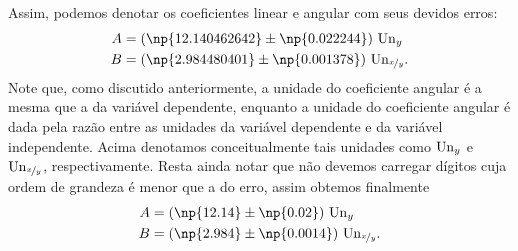 Assim, podemos denotar os coeficientes linear e angular com seus devidos erros:
\begin{align}
	A &= (\np{12.140462642} \pm \np{0.022244})~{\rm{Un}}_y\\
	B &= (\np{2.984480401} \pm \np{0.001378})~{\rm{Un}}_{\nicefrac{x}{y}}.
\end{align}
%
Note que, como discutido anteriormente, a unidade do coeficiente angular é a mesma que a da variável dependente, enquanto a unidade do coeficiente angular é dada pela razão entre as unidades da variável dependente e da variável independente. Acima denotamos conceitualmente tais unidades como ${\rm{Un}}_{y}$ e ${\rm{Un}}_{\nicefrac{x}{y}}$, respectivamente. Resta ainda notar que não devemos carregar dígitos cuja ordem de grandeza é menor que a do erro, assim obtemos finalmente
\begin{align}
	A &= (\np{12.14} \pm \np{0.02})~{\rm{Un}}_y\\
	B &= (\np{2.984} \pm \np{0.0014})~{\rm{Un}}_{\nicefrac{x}{y}}.
\end{align}

